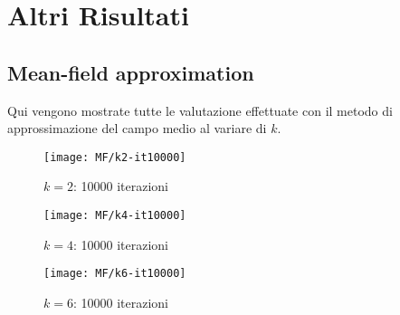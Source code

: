 \section{Altri Risultati}\label{sec:altri-risultati}
\subsection{Mean-field approximation}\label{subsec:app-mean-field-approximation}
    Qui vengono mostrate tutte le valutazione effettuate con il metodo di approssimazione del campo medio al variare di $k$.

    \begin{minipage}{\linewidth}
        \centering
        \begin{minipage}{0.45\linewidth}
            \begin{figure}[H]
            \texttt{[image: MF/k2-it10000]}\caption{$k=2$: 10000 iterazioni}
            \label{fig:mf_k2}
            \end{figure}
        \end{minipage}
        \hspace{0.05\linewidth}
        \begin{minipage}{0.45\linewidth}
            \begin{figure}[H]
            \texttt{[image: MF/k4-it10000]}\caption{$k=4$: 10000 iterazioni}
            \label{fig:mf_k4}
            \end{figure}
        \end{minipage}
        \begin{minipage}{0.45\linewidth}
            \begin{figure}[H]
            \texttt{[image: MF/k6-it10000]}\caption{$k=6$: 10000 iterazioni}
            \label{fig:mf_k6}
            \end{figure}
        \end{minipage}
    \end{minipage}


